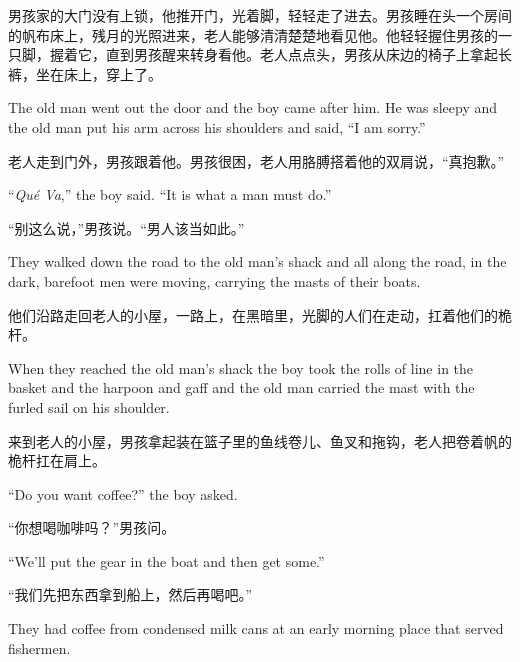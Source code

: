 \begin{paracol}{2}
\switchcolumn

男孩家的大门没有上锁，他推开门，光着脚，轻轻走了进去。男孩睡在头一个房间的帆布床上，残月的光照进来，老人能够清清楚楚地看见他。他轻轻握住男孩的一只脚，握着它，直到男孩醒来转身看他。老人点点头，男孩从床边的椅子上拿起长裤，坐在床上，穿上了。

\switchcolumn*

The old man went out the door and the boy came after him. He was sleepy and
the old man put his arm across his shoulders and said, ``I am \gls{sorry}.''

\switchcolumn

老人走到门外，男孩跟着他。男孩很困，老人用胳膊搭着他的双肩说，“真抱歉。”

\switchcolumn*

``\emph{Qué Va},'' the boy said. ``It is what a man must do.''

\switchcolumn

“别这么说，”男孩说。“男人该当如此。”

\switchcolumn*

They walked down the road to the old man's shack and all along the road, in
the dark, barefoot men were moving, carrying the masts of their boats.

\switchcolumn

他们沿路走回老人的小屋，一路上，在黑暗里，光脚的人们在走动，扛着他们的桅杆。

\switchcolumn*

When they \gls{reached} the old man's shack the boy took the rolls of line
in the basket and the harpoon and gaff and the old man carried the mast with
the furled sail on his shoulder.

\switchcolumn

来到老人的小屋，男孩拿起装在篮子里的鱼线卷儿、鱼叉和拖钩，老人把卷着帆的桅杆扛在肩上。

\switchcolumn*

``Do you want coffee?'' the boy asked.

\switchcolumn

“你想喝咖啡吗？”男孩问。

\switchcolumn*

``We'll put the gear in the boat and then get some.''

\switchcolumn

“我们先把东西拿到船上，然后再喝吧。”

\switchcolumn*

They had coffee from \gls{condensed} milk cans at an early morning place that served fishermen.


\end{paracol}
